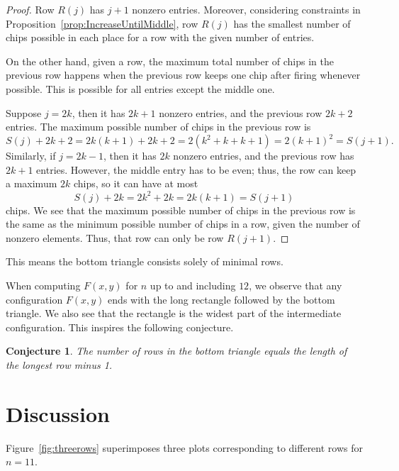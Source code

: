\documentclass[11pt]{article}
\newtheorem{conjecture}[theorem]{Conjecture}
\theoremstyle{definition}
\theoremstyle{remark}
\begin{document}
\begin{proof}
    Row $R(j)$ has $j+1$ nonzero entries. Moreover, considering constraints in Proposition~\ref{prop:IncreaseUntilMiddle}, row $R(j)$ has the smallest number of chips possible in each place for a row with the given number of entries.

    On the other hand, given a row, the maximum total number of chips in the previous row happens when the previous row keeps one chip after firing whenever possible. This is possible for all entries except the middle one.
    
    Suppose $j = 2k$, then it has $2k+1$ nonzero entries, and the previous row $2k+2$ entries. The maximum possible number of chips in the previous row is
    \[S(j) + 2k+2 = 2k(k+1) + 2k+2 = 2(k^2 + k +k+1) = 2(k+1)^2 = S(j+1).\]
    Similarly, if $j=2k-1$, then it has $2k$ nonzero entries, and the previous row has $2k+1$ entries. However, the middle entry has to be even; thus, the row can keep a maximum $2k$ chips, so it can have at most
    \[S(j) + 2k = 2k^2 + 2k = 2k(k+1) = S(j+1)\]
    chips. We see that the maximum possible number of chips in the previous row is the same as the minimum possible number of chips in a row, given the number of nonzero elements. Thus, that row can only be row $R(j+1)$.
\end{proof}

This means the bottom triangle consists solely of minimal rows.

When computing $F(x, y)$ for $n$ up to and including $12$, we observe that any configuration $F(x,y)$ ends with the long rectangle followed by the bottom triangle. We also see that the rectangle is the widest part of the intermediate configuration. This inspires the following conjecture.

\begin{conjecture}
    The number of rows in the bottom triangle equals the length of the longest row minus 1.
\end{conjecture}











\section{Discussion}\label{sec:Discussion}

Figure~\ref{fig:threerows} superimposes three plots corresponding to different rows for $n=11$.
\end{document}
